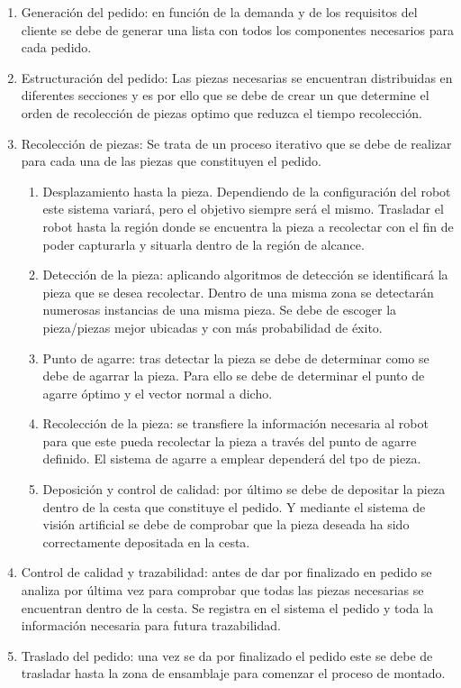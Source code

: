 {\begin{enumerate}
\item Generación del pedido: en función de la demanda y de los requisitos del cliente se debe de generar una lista con todos los componentes necesarios para cada pedido.
\item Estructuración del pedido: Las piezas necesarias se encuentran distribuidas en diferentes secciones y es por ello que se debe de crear un  que determine el orden de recolección de piezas optimo que reduzca el tiempo recolección.
\item Recolección de piezas: Se trata de un proceso iterativo que se debe de realizar para cada una de las piezas que constituyen el pedido.
\begin{enumerate}[label*=\arabic*.]
\item Desplazamiento hasta la pieza. Dependiendo de la configuración del robot este sistema variará, pero el objetivo siempre será el mismo. Trasladar el robot hasta la región donde se encuentra la pieza a recolectar con el fin de poder capturarla y situarla dentro de la región de alcance.
\item Detección de la pieza: aplicando algoritmos de detección se identificará la pieza que se desea recolectar. Dentro de una misma zona se detectarán numerosas instancias de una misma pieza. Se debe de escoger la pieza/piezas mejor ubicadas y con más probabilidad de éxito.
\item Punto de agarre: tras detectar la pieza se debe de determinar como se debe de agarrar la pieza. Para ello se debe de determinar el punto de agarre óptimo y el vector normal a dicho.
\item Recolección de la pieza: se transfiere la información necesaria al robot para que este pueda recolectar la pieza a través del punto de agarre definido. El sistema de agarre a emplear dependerá del tpo de pieza.
\item Deposición y control de calidad: por último se debe de depositar la pieza dentro de la cesta que constituye el pedido. Y mediante el sistema de visión artificial se debe de comprobar que la pieza deseada ha sido correctamente depositada en la cesta.
\end{enumerate}
\item Control de calidad y trazabilidad: antes de dar por finalizado en pedido se analiza por última vez para comprobar que todas las piezas necesarias se encuentran dentro de la cesta. Se registra en el sistema el pedido y toda la información necesaria para futura trazabilidad.
\item Traslado del pedido: una vez se da por finalizado el pedido este se debe de trasladar hasta la zona de ensamblaje para comenzar el proceso de montado.
\end{enumerate}

}
